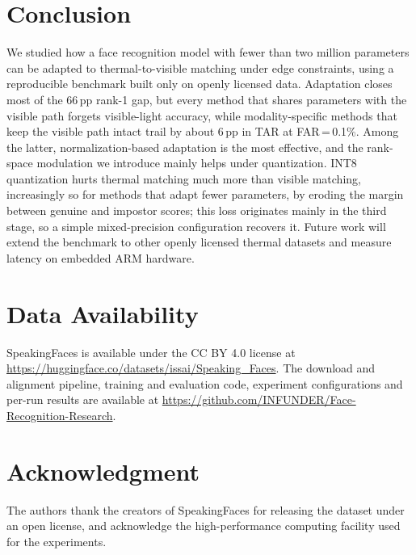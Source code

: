 \documentclass[journal]{IEEEtran}
\begin{document}
\section{Conclusion}
\label{sec:conclusion}
We studied how a face recognition model with fewer than two million parameters can be adapted to thermal-to-visible matching under edge constraints, using a reproducible benchmark built only on openly licensed data. Adaptation closes most of the 66\,pp rank-1 gap, but every method that shares parameters with the visible path forgets visible-light accuracy, while modality-specific methods that keep the visible path intact trail by about 6\,pp in TAR at FAR\,=\,0.1\%. Among the latter, normalization-based adaptation is the most effective, and the rank-space modulation we introduce mainly helps under quantization. INT8 quantization hurts thermal matching much more than visible matching, increasingly so for methods that adapt fewer parameters, by eroding the margin between genuine and impostor scores; this loss originates mainly in the third stage, so a simple mixed-precision configuration recovers it. Future work will extend the benchmark to other openly licensed thermal datasets and measure latency on embedded ARM hardware.

\section*{Data Availability}
SpeakingFaces is available under the CC BY 4.0 license at \url{https://huggingface.co/datasets/issai/Speaking_Faces}. The download and alignment pipeline, training and evaluation code, experiment configurations and per-run results are available at \url{https://github.com/INFUNDER/Face-Recognition-Research}.

\section*{Acknowledgment}
The authors thank the creators of SpeakingFaces for releasing the dataset under an open license, and acknowledge the high-performance computing facility used for the experiments.

\def\BIBdecl{%
  \setlength{\itemsep}{-0.6pt plus 0.1pt}%
  \setlength{\parsep}{0pt}%
}


\end{document}
